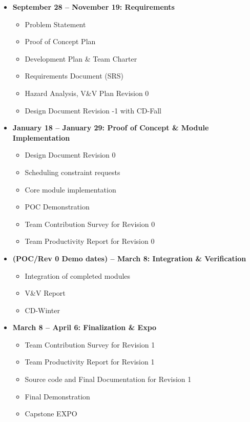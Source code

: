 \documentclass{article}
\begin{document}
\begin{itemize}
    \item \textbf{September 28 -- November 19: Requirements}
    \begin{itemize}
        \item Problem Statement
        \item Proof of Concept Plan
        \item Development Plan \& Team Charter
        \item Requirements Document (SRS)
        \item Hazard Analysis, V\&V Plan Revision 0
        \item Design Document Revision -1 with CD-Fall
    \end{itemize}

    \item \textbf{January 18 -- January 29: Proof of Concept \& Module Implementation}
    \begin{itemize}
        \item Design Document Revision 0
        \item Scheduling constraint requests
        \item Core module implementation
        \item POC Demonstration
        \item Team Contribution Survey for Revision 0
        \item Team Productivity Report for Revision 0
    \end{itemize}

    \item \textbf{(POC/Rev 0 Demo dates) -- March 8: Integration \& Verification}
    \begin{itemize}
        \item Integration of completed modules
        \item V\&V Report
        \item CD-Winter
    \end{itemize}

    \item \textbf{March 8 -- April 6: Finalization \& Expo}
    \begin{itemize}
        \item Team Contribution Survey for Revision 1
        \item Team Productivity Report for Revision 1
        \item Source code and Final Documentation for Revision 1
        \item Final Demonstration
        \item Capstone EXPO
    \end{itemize}
\end{itemize}
\end{document}
